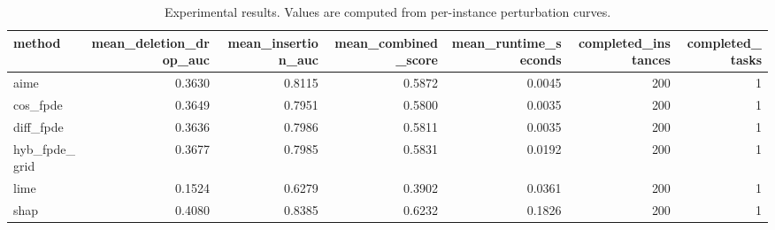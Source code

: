 \begin{table}[t]
\caption{Experimental results. Values are computed from per-instance perturbation curves.}
\label{tab:main_results_computed}
\centering
\begin{tabular}{lrrrrrr}
\toprule
method & mean\_deletion\_drop\_auc & mean\_insertion\_auc & mean\_combined\_score & mean\_runtime\_seconds & completed\_instances & completed\_tasks \\
\midrule
aime & 0.3630 & 0.8115 & 0.5872 & 0.0045 & 200 & 1 \\
cos\_fpde & 0.3649 & 0.7951 & 0.5800 & 0.0035 & 200 & 1 \\
diff\_fpde & 0.3636 & 0.7986 & 0.5811 & 0.0035 & 200 & 1 \\
hyb\_fpde\_grid & 0.3677 & 0.7985 & 0.5831 & 0.0192 & 200 & 1 \\
lime & 0.1524 & 0.6279 & 0.3902 & 0.0361 & 200 & 1 \\
shap & 0.4080 & 0.8385 & 0.6232 & 0.1826 & 200 & 1 \\
\bottomrule
\end{tabular}

\end{table}
